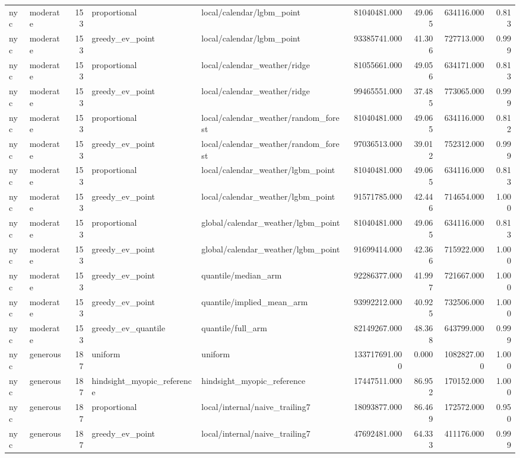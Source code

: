 \begin{tabular}{llrllrrrr}
nyc & moderate & 153 & proportional & local/calendar/lgbm\_point & 81040481.000 & 49.065 & 634116.000 & 0.813 \\
nyc & moderate & 153 & greedy\_ev\_point & local/calendar/lgbm\_point & 93385741.000 & 41.306 & 727713.000 & 0.999 \\
nyc & moderate & 153 & proportional & local/calendar\_weather/ridge & 81055661.000 & 49.056 & 634171.000 & 0.813 \\
nyc & moderate & 153 & greedy\_ev\_point & local/calendar\_weather/ridge & 99465551.000 & 37.485 & 773065.000 & 0.999 \\
nyc & moderate & 153 & proportional & local/calendar\_weather/random\_forest & 81040481.000 & 49.065 & 634116.000 & 0.812 \\
nyc & moderate & 153 & greedy\_ev\_point & local/calendar\_weather/random\_forest & 97036513.000 & 39.012 & 752312.000 & 0.999 \\
nyc & moderate & 153 & proportional & local/calendar\_weather/lgbm\_point & 81040481.000 & 49.065 & 634116.000 & 0.813 \\
nyc & moderate & 153 & greedy\_ev\_point & local/calendar\_weather/lgbm\_point & 91571785.000 & 42.446 & 714654.000 & 1.000 \\
nyc & moderate & 153 & proportional & global/calendar\_weather/lgbm\_point & 81040481.000 & 49.065 & 634116.000 & 0.813 \\
nyc & moderate & 153 & greedy\_ev\_point & global/calendar\_weather/lgbm\_point & 91699414.000 & 42.366 & 715922.000 & 1.000 \\
nyc & moderate & 153 & greedy\_ev\_point & quantile/median\_arm & 92286377.000 & 41.997 & 721667.000 & 1.000 \\
nyc & moderate & 153 & greedy\_ev\_point & quantile/implied\_mean\_arm & 93992212.000 & 40.925 & 732506.000 & 1.000 \\
nyc & moderate & 153 & greedy\_ev\_quantile & quantile/full\_arm & 82149267.000 & 48.368 & 643799.000 & 0.999 \\
nyc & generous & 187 & uniform & uniform & 133717691.000 & 0.000 & 1082827.000 & 1.000 \\
nyc & generous & 187 & hindsight\_myopic\_reference & hindsight\_myopic\_reference & 17447511.000 & 86.952 & 170152.000 & 1.000 \\
nyc & generous & 187 & proportional & local/internal/naive\_trailing7 & 18093877.000 & 86.469 & 172572.000 & 0.950 \\
nyc & generous & 187 & greedy\_ev\_point & local/internal/naive\_trailing7 & 47692481.000 & 64.333 & 411176.000 & 0.999 \\

\end{tabular}
